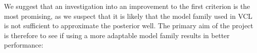 \documentclass[a4paper,11=0pt]{article}
\begin{document}
\vspace{-1em}
We suggest that an investigation into an improvement to the first criterion is the most promising, as we suspect that it is likely that the model family used in VCL is not sufficient to approximate the posterior well. The primary aim of the project is therefore to see if using a more adaptable model family results in better performance:
\end{document}

